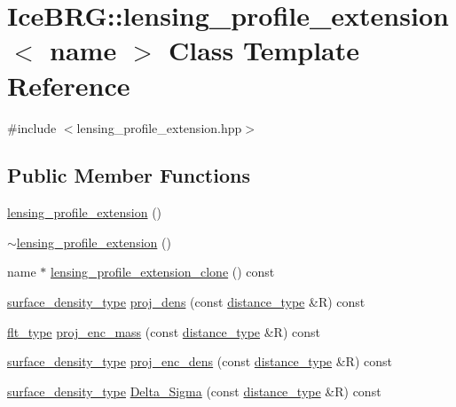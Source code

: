 \hypertarget{classIceBRG_1_1lensing__profile__extension}{\section{Ice\-B\-R\-G\-:\-:lensing\-\_\-profile\-\_\-extension$<$ name $>$ Class Template Reference}
\label{classIceBRG_1_1lensing__profile__extension}
}


{\ttfamily \#include $<$lensing\-\_\-profile\-\_\-extension.\-hpp$>$}

\subsection*{Public Member Functions}
\begin{DoxyCompactItemize}
\item 
\hyperlink{classIceBRG_1_1lensing__profile__extension_adeb6f629b5ed4c1a736ff4ffc6ed2812}{lensing\-\_\-profile\-\_\-extension} ()
\item 
\hyperlink{classIceBRG_1_1lensing__profile__extension_a5107ff816ca51042158cdd4bd00674c8}{$\sim$lensing\-\_\-profile\-\_\-extension} ()
\item 
name $\ast$ \hyperlink{classIceBRG_1_1lensing__profile__extension_ac82a0292013dde065e28c0b5922727f8}{lensing\-\_\-profile\-\_\-extension\-\_\-clone} () const 
\item 
\hyperlink{namespaceIceBRG_a80c597ef5ba0a32491d32a9f0083b02d}{surface\-\_\-density\-\_\-type} \hyperlink{classIceBRG_1_1lensing__profile__extension_a304474bb2ef5d0a45bd0b916ea7d1e19}{proj\-\_\-dens} (const \hyperlink{namespaceIceBRG_a45499647eb87e24c10ab32c628711cec}{distance\-\_\-type} \&R) const 
\item 
\hyperlink{lib_2IceBRG__main_2common_8h_ad0f130a56eeb944d9ef2692ee881ecc4}{flt\-\_\-type} \hyperlink{classIceBRG_1_1lensing__profile__extension_a92acfaacb68a0c8118a41ad2e881c920}{proj\-\_\-enc\-\_\-mass} (const \hyperlink{namespaceIceBRG_a45499647eb87e24c10ab32c628711cec}{distance\-\_\-type} \&R) const 
\item 
\hyperlink{namespaceIceBRG_a80c597ef5ba0a32491d32a9f0083b02d}{surface\-\_\-density\-\_\-type} \hyperlink{classIceBRG_1_1lensing__profile__extension_a1dbac03a5d151f664be31af6d475dec8}{proj\-\_\-enc\-\_\-dens} (const \hyperlink{namespaceIceBRG_a45499647eb87e24c10ab32c628711cec}{distance\-\_\-type} \&R) const 
\item 
\hyperlink{namespaceIceBRG_a80c597ef5ba0a32491d32a9f0083b02d}{surface\-\_\-density\-\_\-type} \hyperlink{classIceBRG_1_1lensing__profile__extension_a1e90be0176ced0a03d94ba632caca497}{Delta\-\_\-\-Sigma} (const \hyperlink{namespaceIceBRG_a45499647eb87e24c10ab32c628711cec}{distance\-\_\-type} \&R) const 

\end{DoxyCompactItemize}
